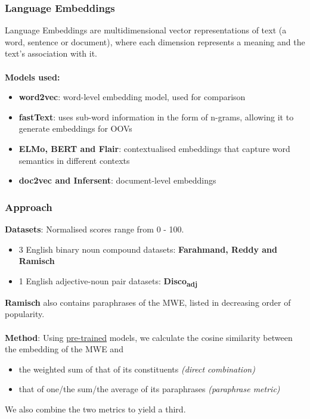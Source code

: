 \documentclass{beamer}
\begin{document}
\begin{frame}
\frametitle{Language Embeddings}
Language Embeddings are multidimensional vector representations of text (a word, sentence or document), where each dimension represents a meaning and the text's association with it.
\\~\\
\textbf{Models used:}
\begin{itemize}
    \item \textbf{word2vec}: word-level embedding model, used for comparison
    \item \textbf{fastText}: uses sub-word information in the form of n-grams, allowing it to generate embeddings for OOVs
    \item \textbf{ELMo, BERT and Flair}: contextualised embeddings that capture word semantics in different contexts
    \item \textbf{doc2vec and Infersent}: document-level embeddings
\end{itemize}
\end{frame}


\begin{frame}
\frametitle{Approach}
\textbf{Datasets}: Normalised scores range from 0 - 100.
\begin{itemize}
    \item 3 English binary noun compound datasets: \textbf{Farahmand, Reddy and Ramisch}
    \item 1 English adjective-noun pair datasets: \textbf{Disco\textsubscript{adj}}
\end{itemize}
\textbf{Ramisch} also contains paraphrases of the MWE, listed in decreasing order of popularity.\\~\\

\textbf{Method}: Using \uline{pre-trained} models, we calculate the cosine similarity between the embedding of the MWE and
\begin{itemize}
    \item the weighted sum of that of its constituents \textit{(direct combination)}
    \item that of one/the sum/the average of its paraphrases \textit{(paraphrase metric)}
\end{itemize}
We also combine the two metrics to yield a third.
\end{frame}
\end{document}
